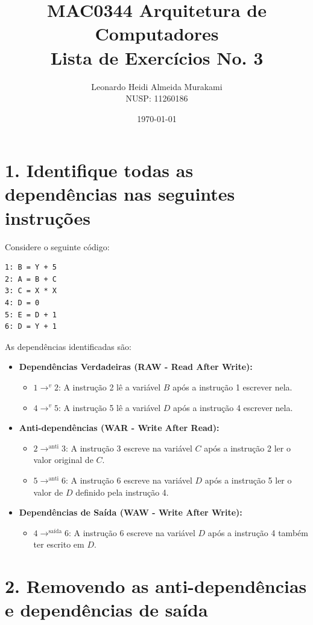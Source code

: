 \documentclass{article}
\title{MAC0344 Arquitetura de Computadores \\ Lista de Exercícios No. 3}
\author{Leonardo Heidi Almeida Murakami \\ NUSP: 11260186}
\date{\today}
\begin{document}
\maketitle

\section*{1. Identifique todas as dependências nas seguintes instruções}

Considere o seguinte código:
\begin{verbatim}
1: B = Y + 5
2: A = B + C
3: C = X * X
4: D = 0
5: E = D + 1
6: D = Y + 1
\end{verbatim}

As dependências identificadas são:

\begin{itemize}
    \item \textbf{Dependências Verdadeiras (RAW - Read After Write):}
    \begin{itemize}
        \item $1 \rightarrow^{v} 2$: A instrução 2 lê a variável $B$ após a instrução 1 escrever nela.
        \item $4 \rightarrow^{v} 5$: A instrução 5 lê a variável $D$ após a instrução 4 escrever nela.
    \end{itemize}
    \bigskip
    \item \textbf{Anti-dependências (WAR - Write After Read):}
    \begin{itemize}
        \item $2 \rightarrow^{\text{anti}} 3$: A instrução 3 escreve na variável $C$ após a instrução 2 ler o valor original de $C$.
        \item $5 \rightarrow^{\text{anti}} 6$: A instrução 6 escreve na variável $D$ após a instrução 5 ler o valor de $D$ definido pela instrução 4.
    \end{itemize}
    \bigskip
    \item \textbf{Dependências de Saída (WAW - Write After Write):}
    \begin{itemize}
        \item $4 \rightarrow^{\text{saída}} 6$: A instrução 6 escreve na variável $D$ após a instrução 4 também ter escrito em $D$.
    \end{itemize}
\end{itemize}

\newpage
\section*{2. Removendo as anti-dependências e dependências de saída}
\end{document}
